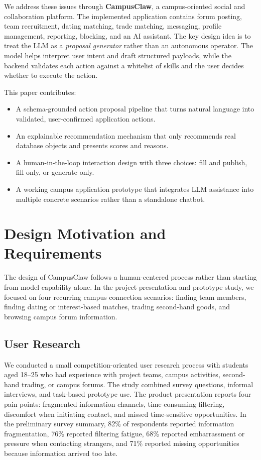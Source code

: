 \documentclass[twocolumn]{article}
\begin{document}
We address these issues through \textbf{CampusClaw}, a campus-oriented social and collaboration platform. The implemented application contains forum posting, team recruitment, dating matching, trade matching, messaging, profile management, reporting, blocking, and an AI assistant. The key design idea is to treat the LLM as a \emph{proposal generator} rather than an autonomous operator. The model helps interpret user intent and draft structured payloads, while the backend validates each action against a whitelist of skills and the user decides whether to execute the action.

This paper contributes:
\begin{itemize}
    \item A schema-grounded action proposal pipeline that turns natural language into validated, user-confirmed application actions.
    \item An explainable recommendation mechanism that only recommends real database objects and presents scores and reasons.
    \item A human-in-the-loop interaction design with three choices: fill and publish, fill only, or generate only.
    \item A working campus application prototype that integrates LLM assistance into multiple concrete scenarios rather than a standalone chatbot.
\end{itemize}

\section{Design Motivation and Requirements}
The design of CampusClaw follows a human-centered process rather than starting from model capability alone. In the project presentation and prototype study, we focused on four recurring campus connection scenarios: finding team members, finding dating or interest-based matches, trading second-hand goods, and browsing campus forum information.

\subsection{User Research}
We conducted a small competition-oriented user research process with students aged 18--25 who had experience with project teams, campus activities, second-hand trading, or campus forums. The study combined survey questions, informal interviews, and task-based prototype use. The product presentation reports four pain points: fragmented information channels, time-consuming filtering, discomfort when initiating contact, and missed time-sensitive opportunities. In the preliminary survey summary, 82\% of respondents reported information fragmentation, 76\% reported filtering fatigue, 68\% reported embarrassment or pressure when contacting strangers, and 71\% reported missing opportunities because information arrived too late.
\end{document}
